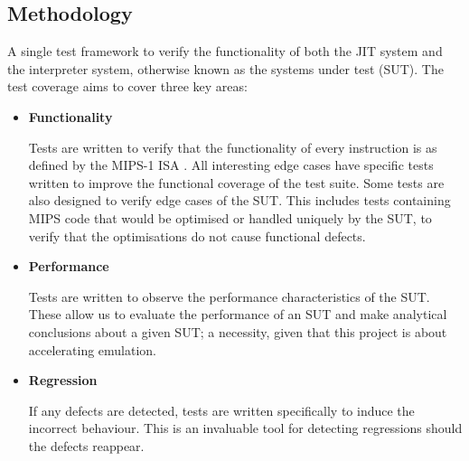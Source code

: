 \subsection{Methodology}

A single test framework to verify the functionality of both the JIT system and the interpreter system, otherwise known as the systems under test (SUT). The test coverage aims to cover three key areas:

\begin{itemize}
    \item \textbf{Functionality}
    
    Tests are written to verify that the functionality of every instruction is as defined by the MIPS-1 ISA \cite{mips-1-isa}. All interesting edge cases have specific tests written to improve the functional coverage of the test suite. Some tests are also designed to verify edge cases of the SUT. This includes tests containing MIPS code that would be optimised or handled uniquely by the SUT, to verify that the optimisations do not cause functional defects.
    
    \item \textbf{Performance}
    
    Tests are written to observe the performance characteristics of the SUT. These allow us to evaluate the performance of an SUT and make analytical conclusions about a given SUT; a necessity, given that this project is about accelerating emulation.
    
    \item \textbf{Regression}
    
    If any defects are detected, tests are written specifically to induce the incorrect behaviour. This is an invaluable tool for detecting regressions should the defects reappear.
\end{itemize}